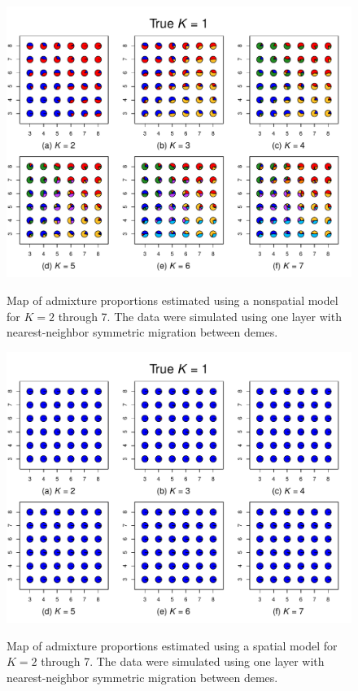 \documentclass[10pt,letterpaper]{article}
\newif\iffloatsatend
\begin{document}
\iffloatsatend
\processdelayedfloats
\fi

\clearpage

\begin{figure}
	\centering
		{\includegraphics[width=\textwidth]{figs/sims/simK1_nsp_pies.pdf}}
	\caption{
	Map of admixture proportions estimated using a nonspatial model for $K=2$ through 7.
	The data were simulated using one layer with nearest-neighbor symmetric migration between demes.
    }\label{simK1_nsp_pies}
\end{figure}
\clearpage

\begin{figure}
	\centering
		{\includegraphics[width=\textwidth]{figs/sims/simK1_sp_pies.pdf}}
	\caption{
	Map of admixture proportions estimated using a spatial model for $K=2$ through 7.
	The data were simulated using one layer with nearest-neighbor symmetric migration between demes.
    }\label{simK1_sp_pies}
\end{figure}
\clearpage
\end{document}
